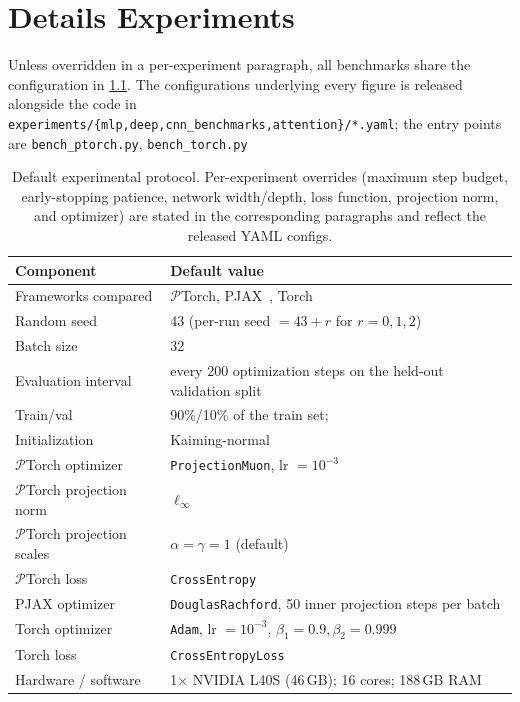 \chapter{Details Experiments}
Unless overridden in a per-experiment paragraph, all benchmarks share the configuration in \cref{tab:shared-protocol}. The configurations underlying every figure is released alongside the code in
\texttt{experiments/\{mlp,deep,cnn\_benchmarks,attention\}/*.yaml}; the entry
points are \texttt{bench\_ptorch.py}, \texttt{bench\_torch.py}
\begin{table}[h]
\centering
\caption{Default experimental protocol. Per-experiment overrides
(maximum step budget, early-stopping patience, network width/depth,
loss function, projection norm, and optimizer) are stated in the
corresponding paragraphs and reflect the released YAML
configs.}
\small
\renewcommand{\arraystretch}{1.0}
\begin{tabular}{@{}ll@{}}
\toprule
\textbf{Component} & \textbf{Default value} \\
\midrule
Frameworks compared      & $\mathcal{P}$Torch, PJAX~\cite{bergmeister2025projection}, Torch~\cite{paszke2019pytorchimperativestylehighperformance} \\
Random seed              & 43 (per-run seed $= 43 + r$ for $r=0,1,2$) \\
Batch size               & 32 \\
Evaluation interval      & every 200 optimization steps on the held-out validation split \\
Train/val     & 90\%/10\% of the train set; \\
Initialization           & Kaiming-normal \\
$\mathcal{P}$Torch optimizer  & \texttt{ProjectionMuon}, lr $=10^{-3}$ \\
$\mathcal{P}$Torch projection norm & $\ell_\infty$ \\
$\mathcal{P}$Torch projection scales & $\alpha = \gamma = 1$ (default) \\
$\mathcal{P}$Torch loss       & \texttt{CrossEntropy} \\
PJAX optimizer  & \texttt{DouglasRachford}, 50 inner projection steps per batch \\
Torch optimizer & \texttt{Adam}, lr $=10^{-3}$, $\beta_1{=}0.9,\beta_2{=}0.999$ \\
Torch loss      & \texttt{CrossEntropyLoss} \\
Hardware / software      & 1$\times$ NVIDIA L40S (46\,GB); 16 cores; 188\,GB RAM\\
\bottomrule
\end{tabular}
\label{tab:shared-protocol}
\end{table}